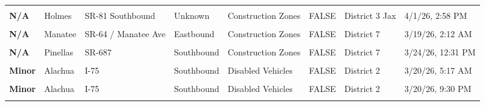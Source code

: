 \documentclass[
]{article}
\begin{document}
\begin{longtable}[t]{>{\raggedright\arraybackslash}p{1.5cm}>{\raggedright\arraybackslash}p{2.5cm}>{\raggedright\arraybackslash}p{3cm}>{\raggedright\arraybackslash}p{1.8cm}>{\raggedright\arraybackslash}p{2.5cm}lll}
\endfoot
\bottomrule
\endlastfoot
\textbf{\cellcolor{gray!10}{N/A}} & \cellcolor{gray!10}{Escambia} & \cellcolor{gray!10}{W Nine Mile Rd} & \cellcolor{gray!10}{Both Directions} & \cellcolor{gray!10}{Construction Zones} & \cellcolor{gray!10}{FALSE} & \cellcolor{gray!10}{District 3} & \cellcolor{gray!10}{4/1/26, 3:07 PM}\\
\textbf{N/A} & Holmes & SR-81 Southbound & Unknown & Construction Zones & FALSE & District 3 Jax & 4/1/26, 2:58 PM\\
\textbf{\cellcolor{gray!10}{N/A}} & \cellcolor{gray!10}{Holmes} & \cellcolor{gray!10}{SR-81 Northbound} & \cellcolor{gray!10}{Unknown} & \cellcolor{gray!10}{Construction Zones} & \cellcolor{gray!10}{FALSE} & \cellcolor{gray!10}{District 3 Jax} & \cellcolor{gray!10}{4/1/26, 2:58 PM}\\
\textbf{N/A} & Manatee & SR-64 / Manatee Ave & Eastbound & Construction Zones & FALSE & District 7 & 3/19/26, 2:12 AM\\
\textbf{\cellcolor{gray!10}{N/A}} & \cellcolor{gray!10}{Palm Beach} & \cellcolor{gray!10}{Floridas Turnpike} & \cellcolor{gray!10}{Northbound} & \cellcolor{gray!10}{Construction Zones} & \cellcolor{gray!10}{FALSE} & \cellcolor{gray!10}{District 4} & \cellcolor{gray!10}{3/22/26, 10:10 PM}\\
\addlinespace
\textbf{N/A} & Pinellas & SR-687 & Southbound & Construction Zones & FALSE & District 7 & 3/24/26, 12:31 PM\\
\textbf{\cellcolor{gray!10}{N/A}} & \cellcolor{gray!10}{Putnam} & \cellcolor{gray!10}{Roddy Rd} & \cellcolor{gray!10}{Both Directions} & \cellcolor{gray!10}{Construction Zones} & \cellcolor{gray!10}{FALSE} & \cellcolor{gray!10}{District 2} & \cellcolor{gray!10}{7/3/24, 11:04 AM}\\
\textbf{Minor} & Alachua & I-75 & Southbound & Disabled Vehicles & FALSE & District 2 & 3/20/26, 5:17 AM\\
\textbf{\cellcolor{gray!10}{Minor}} & \cellcolor{gray!10}{Alachua} & \cellcolor{gray!10}{I-75} & \cellcolor{gray!10}{Northbound} & \cellcolor{gray!10}{Disabled Vehicles} & \cellcolor{gray!10}{FALSE} & \cellcolor{gray!10}{District 2} & \cellcolor{gray!10}{3/20/26, 6:21 AM}\\
\textbf{Minor} & Alachua & I-75 & Southbound & Disabled Vehicles & FALSE & District 2 & 3/20/26, 9:30 PM\\
\addlinespace
\textbf{\cellcolor{gray!10}{Minor}} & \cellcolor{gray!10}{Alachua} & \cellcolor{gray!10}{I-75} & \cellcolor{gray!10}{Southbound} & \cellcolor{gray!10}{Disabled Vehicles} & \cellcolor{gray!10}{FALSE} & \cellcolor{gray!10}{District 2} & \cellcolor{gray!10}{3/20/26, 10:58 PM}\\

\end{longtable}
\end{document}
